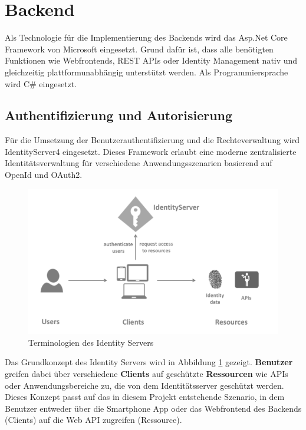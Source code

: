 \section{Backend}
Als Technologie für die Implementierung des Backends wird das Asp.Net Core Framework von Microsoft eingesetzt. Grund dafür ist, dass alle benötigten Funktionen wie Webfrontends, REST APIs oder Identity Management nativ und gleichzeitig plattformunabhängig unterstützt werden. Als Programmiersprache wird C\# eingesetzt.

\subsection{Authentifizierung und Autorisierung}
Für die Umsetzung der Benutzerauthentifizierung und die Rechteverwaltung wird IdentityServer4\cite{Allen2016} eingesetzt. Dieses Framework erlaubt eine moderne zentralisierte Identitätsverwaltung für verschiedene Anwendungsszenarien basierend auf OpenId und OAuth2. 

\begin{figure}[h]
  \begin{center}
    \includegraphics[width=\textwidth]{./img/BackendIdentityServer.png}
    \caption{Terminologien des Identity Servers}
    \label{fig:backendIdentityServer}
  \end{center}
\end{figure}

Das Grundkonzept des Identity Servers wird in Abbildung \ref{fig:backendIdentityServer} gezeigt. \textbf{Benutzer} greifen dabei über verschiedene \textbf{Clients} auf geschützte \textbf{Ressourcen} wie APIs oder Anwendungsbereiche zu, die von dem Identitätsserver geschützt werden. Dieses Konzept passt auf das in diesem Projekt entstehende Szenario, in dem Benutzer entweder über die Smartphone App oder das Webfrontend des Backends (Clients) auf die Web API zugreifen (Ressource).


